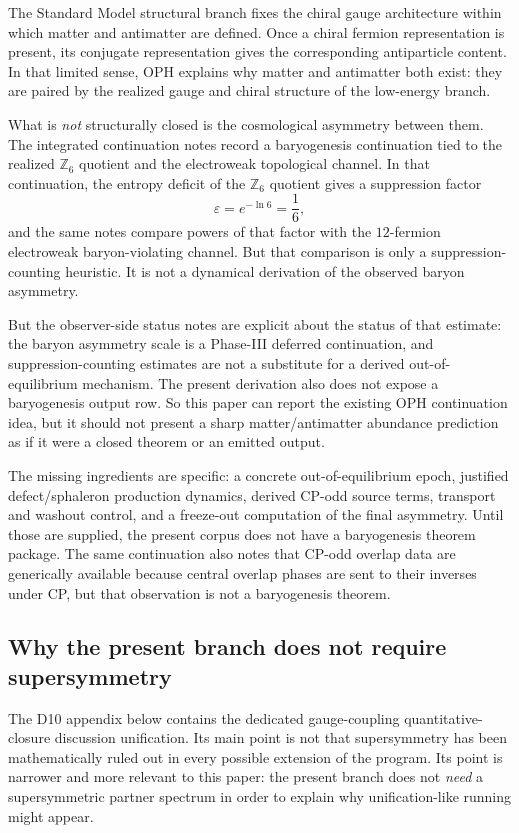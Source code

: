 \documentclass[11pt]{article}
\begin{document}
The Standard Model structural branch fixes the chiral gauge architecture within which
matter and antimatter are defined. Once a chiral fermion representation is present, its conjugate
representation gives the corresponding antiparticle content. In that limited sense, OPH explains
why matter and antimatter both exist: they are paired by the realized gauge and chiral structure
of the low-energy branch.

What is \emph{not} structurally closed is the cosmological asymmetry between them. The
integrated continuation notes record a baryogenesis continuation tied to the realized
\(\mathbb Z_6\) quotient and the electroweak topological channel. In that continuation, the
entropy deficit of the \(\mathbb Z_6\) quotient gives a suppression factor
\[
\varepsilon = e^{-\ln 6} = \frac{1}{6},
\]
and the same notes compare powers of that factor with the \(12\)-fermion electroweak
baryon-violating channel. But that comparison is only a suppression-counting heuristic. It is
not a dynamical derivation of the observed baryon asymmetry.

But the observer-side status notes are explicit about the status of that estimate: the baryon
asymmetry scale is a Phase-III deferred continuation, and suppression-counting estimates are
not a substitute for a derived out-of-equilibrium mechanism. The present derivation
also does not expose a baryogenesis output row. So this paper can report the
existing OPH continuation idea, but it should not present a sharp matter/antimatter abundance
prediction as if it were a closed theorem or an emitted output.

The missing ingredients are specific: a concrete out-of-equilibrium epoch, justified
defect/sphaleron production dynamics, derived CP-odd source terms, transport and washout control,
and a freeze-out computation of the final asymmetry. Until those are supplied, the present
corpus does not have a baryogenesis theorem package. The same continuation also notes that CP-odd
overlap data are generically available because central overlap phases are sent to their inverses
under CP, but that observation is not a baryogenesis theorem.

\subsection{Why the present branch does not require supersymmetry}

The D10 appendix below contains the dedicated gauge-coupling quantitative-closure discussion
unification. Its main point is not that supersymmetry has been mathematically ruled out in every
possible extension of the program. Its point is narrower and more relevant to this paper: the present
branch does not \emph{need} a supersymmetric partner spectrum in order to explain why
unification-like running might appear.
\end{document}

